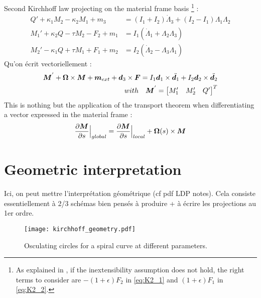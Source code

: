 Second Kirchhoff law projecting on the material frame basis 
\footnote{As explained in \cite[p. 18]{Dill1992}, if the inextensibility assumption does not hold, the right terms to consider are $-(1+\epsilon)F_2$ in \cref{eq:K2_1} and $(1+\epsilon)F_1$ in \cref{eq:K2_2}.} :
\begin{subequations}
	\begin{align}
		Q' + \kappa_1 M_2 - \kappa_2 M_1 + m_3 &= (I_1 + I_2)\dot{\Lambda}_3 + (I_2 - I_1)\Lambda_1\Lambda_2
		\label{eq:K2_2}\\
		M_1' + \kappa_2 Q - \tau M_2 - F_2 + m_1 &= I_1 (\dot{\Lambda}_1 + \Lambda_2 \Lambda_3)
		\label{eq:K2_1}\\
		M_2' - \kappa_1 Q + \tau M_1 + F_1 + m_2 &= I_2 (\dot{\Lambda}_2 - \Lambda_3 \Lambda_1)
		\label{eq:K2_2}
	\end{align}
\end{subequations}
Qu'on écrit vectoriellement : 
\begin{align}
	\boldsymbol{M}^{'} + \boldsymbol{\Omega} \times \boldsymbol{M} + \boldsymbol{m}_{ext} + \boldsymbol{d}_3 \times \boldsymbol{F} = I_1 \boldsymbol{d}_1 \times \ddot{\boldsymbol{d}_1} + I_2 \boldsymbol{d}_2 \times \ddot{\boldsymbol{d}_2} \\
	\quad with \quad
	\boldsymbol{M}^{'} = 
	\begin{bmatrix}M'_1 & M'_2 & Q'\end{bmatrix}^T
\end{align}
This is nothing but the application of the transport theorem when differentiating a vector expressed in the material frame : 
\begin{equation}
	\frac{\partial \boldsymbol{M}}{\partial s}\Bigr|_{global} = \frac{\partial \boldsymbol{M}}{\partial s}\Bigr|_{local} + \boldsymbol{\Omega}(s) \times \boldsymbol{M}
\end{equation}

\section{Geometric interpretation}

Ici, on peut mettre l'interprétation géométrique (cf pdf LDP notes).
Cela consiste essentiellement à 2/3 schémas bien pensés à produire + à écrire les projections au 1er ordre.
 
\begin{figure}[h]
	\centering
	\texttt{[image: kirchhoff\_geometry.pdf]}
	\caption{Osculating circles for a spiral curve at different parameters.}
	\label{fig:5}
\end{figure} 
 
